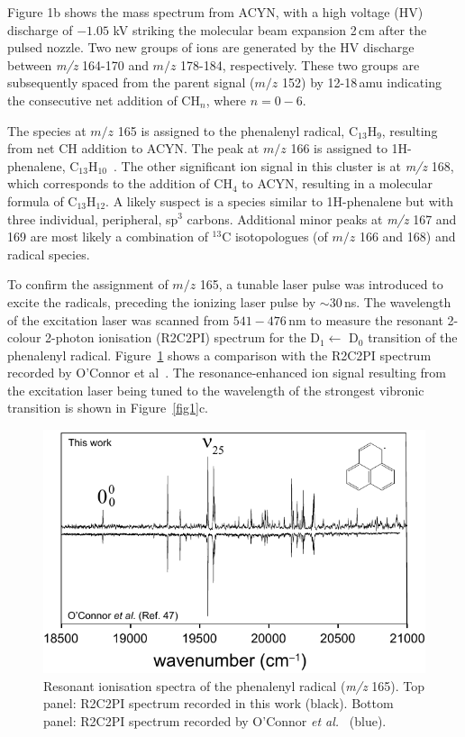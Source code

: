 \documentclass[journal=jacsat,manuscript=article,layout=onecolumn]{achemso}
\begin{document}
Figure 1b shows the mass spectrum from ACYN, with a high voltage (HV) discharge of $-1.05$ kV striking the molecular beam expansion 2\,cm after the pulsed nozzle. Two new groups of ions are generated by the HV discharge between \textit{m/z} 164-170 and $m/z$ 178-184, respectively. These two groups are subsequently spaced from the parent signal ($m/z$ 152) by 12-18\,amu indicating the consecutive net addition of CH$_n$, where $n=0-6$.

The species at $m/z$ 165 is assigned to the phenalenyl radical, C$_{13}$H$_9$, resulting from net CH addition to ACYN. The peak at $m/z$ 166 is assigned to 1H-phenalene, C$_{13}$H$_{10}$~\cite{oco17}. The other significant ion signal in this cluster is at \textit{m/z} 168, which corresponds to the addition of CH$_4$ to ACYN, resulting in a molecular formula of C$_{13}$H$_{12}$. A likely suspect is a species similar to 1H-phenalene but with three individual, peripheral, sp$^3$ carbons. Additional minor peaks at \textit{m/z} 167 and 169 are most likely a combination of $^{13}$C isotopologues (of $m/z$ 166 and 168) and radical species.

To confirm the assignment of $m/z$ 165, a tunable laser pulse was introduced to excite the radicals, preceding the ionizing laser pulse by $\sim$30\,ns. The wavelength of the excitation laser was scanned from $541-476$\,nm to measure the resonant 2-colour 2-photon ionisation (R2C2PI) spectrum for the D$_1 \leftarrow$ D$_0$ transition of the phenalenyl radical. Figure~\ref{fig2} shows a comparison with the R2C2PI spectrum recorded by O'Connor et al~\cite{oco11}. The resonance-enhanced ion signal resulting from the excitation laser being tuned to the wavelength of the strongest vibronic transition is shown in Figure~\ref{fig1}c.

\begin{figure} [h!]
	\includegraphics[width=15cm]{Figures/Figure2}
	\caption{Resonant ionisation spectra of the phenalenyl radical (\textit{m/z} 165). Top panel: R2C2PI spectrum recorded in this work (black). Bottom panel: R2C2PI spectrum recorded by O'Connor \textit{et al.}~\cite{oco11} (blue).}
	\label{fig2}
\end{figure}
\end{document}
